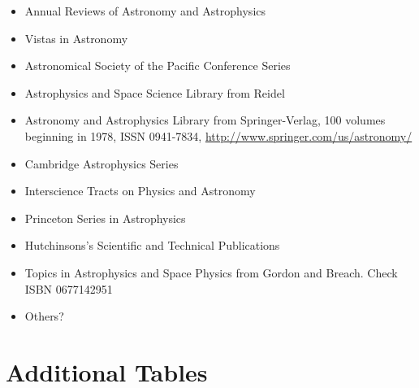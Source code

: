 \documentclass[letterpaper]{article}
\begin{document}
\begin{itemize}
  \item Annual Reviews of Astronomy and Astrophysics
  \item Vistas in Astronomy
  \item Astronomical Society of the Pacific Conference Series
  \item Astrophysics and Space Science Library from Reidel
  \item Astronomy and Astrophysics Library from Springer-Verlag, 100 volumes beginning in 1978, ISSN 0941-7834, \url{http://www.springer.com/us/astronomy/}
  \item Cambridge Astrophysics Series
  \item Interscience Tracts on Physics and Astronomy
  \item Princeton Series in Astrophysics
  \item Hutchinsons's Scientific and Technical Publications
  \item Topics in Astrophysics and Space Physics from Gordon and Breach. Check ISBN 0677142951
  \item Others?
\end{itemize}

\section{Additional Tables}


\end{document}
